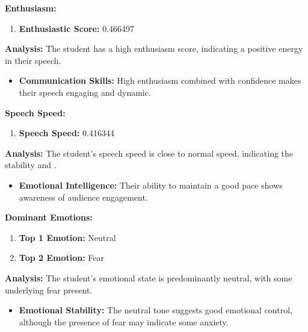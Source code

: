\documentclass{article}
\begin{document}
    \large{\textbf{Enthusiasm:}}
    \begin{tcolorbox}[colback=orange!10!white, colframe=orange!80!black, title=Enthusiastic Score]
        \begin{enumerate}
            \item \textbf{Enthusiastic Score:} \textcolor{orange!70!black}{0.466497}
        \end{enumerate}
        \textbf{Analysis:} The student has a high enthusiasm score, indicating a positive energy in their speech.
        \begin{itemize}
            \item \textbf{Communication Skills:} High enthusiasm combined with confidence makes their speech engaging and dynamic.
        \end{itemize}
    \end{tcolorbox}

    \large{\textbf{Speech Speed:}}
    \begin{tcolorbox}[colback=purple!10!white, colframe=purple!80!black, title=Speech Speed]
        \begin{enumerate}
            \item \textbf{Speech Speed:} \textcolor{purple!70!black}{0.416344}
        \end{enumerate}
        \textbf{Analysis:} The student's speech speed is close to normal speed, indicating the stability and .
        \begin{itemize}
            \item \textbf{Emotional Intelligence:} Their ability to maintain a good pace shows awareness of audience engagement.
        \end{itemize}
    \end{tcolorbox}

    \large{\textbf{Dominant Emotions:}}
    \begin{tcolorbox}[colback=pink!10!white, colframe=pink!80!black, title=Emotional State]
        \begin{enumerate}
            \item \textbf{Top 1 Emotion:} \textcolor{blue!80!black}{Neutral}
            \item \textbf{Top 2 Emotion:} \textcolor{red!80!black}{Fear}
        \end{enumerate}
        \textbf{Analysis:} The student's emotional state is predominantly neutral, with some underlying fear present.
        \begin{itemize}
            \item \textbf{Emotional Stability:} The neutral tone suggests good emotional control, although the presence of fear may indicate some anxiety.
        \end{itemize}
    \end{tcolorbox}
\end{document}
